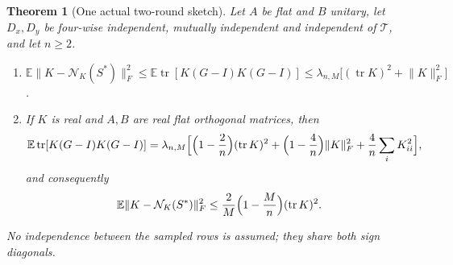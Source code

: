 \documentclass[11pt,a4paper]{article}
\newtheorem{theorem}{Theorem}[section]
\theoremstyle{definition}
\theoremstyle{remark}
\numberwithin{equation}{section}
\newcommand{\E}{\mathbb E}
\newcommand{\tr}{\operatorname{tr}}
\newcommand{\norm}[1]{\lVert#1\rVert}
\newcommand{\Nys}{\mathcal N}
\newcommand{\cT}{\mathcal T}
\begin{document}
\begin{theorem}[One actual two-round sketch]\label{thm:whole}
Let $A$ be flat and $B$ unitary, let $D_x,D_y$ be four-wise independent,
mutually independent and independent of $\cT$, and let $n\ge2$.
\begin{enumerate}[label=(\alph*)]
\item $\E\norm{K-\Nys_K(S^*)}_F^2\le\E\tr[K(G-I)K(G-I)]\le
\lambda_{n,M}\bigl[(\tr K)^2+\norm K_F^2\bigr]$.
\item If $K$ is real and $A,B$ are real flat orthogonal matrices, then
\begin{equation}\label{eq:twoexact}
 \E\tr[K(G-I)K(G-I)]=\lambda_{n,M}\Bigl[\Bigl(1-\frac2n\Bigr)(\tr K)^2
 +\Bigl(1-\frac4n\Bigr)\norm K_F^2+\frac4n\sum_iK_{ii}^2\Bigr],
\end{equation}
and consequently
\begin{equation}\label{eq:simple}
 \E\norm{K-\Nys_K(S^*)}_F^2\le\frac2M\Bigl(1-\frac Mn\Bigr)(\tr K)^2 .
\end{equation}
\end{enumerate}
No independence between the sampled rows is assumed; they share both sign
diagonals.
\end{theorem}
\end{document}
